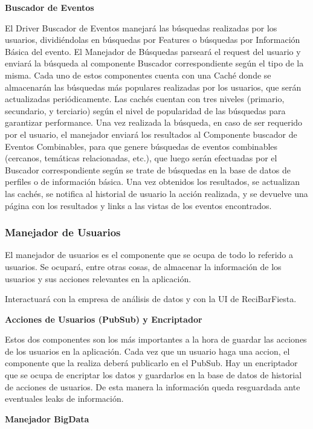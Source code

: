 \textbf{Buscador de Eventos}

El Driver Buscador de Eventos manejará las búsquedas realizadas por los usuarios, dividiéndolas en búsquedas por Features o búsquedas por Información Básica del evento. El Manejador de Búsquedas parseará el request del usuario y enviará la búsqueda al componente Buscador correspondiente según el tipo de la misma. Cada uno de estos componentes cuenta con una Caché donde se almacenarán las búsquedas más populares realizadas por los usuarios, que serán actualizadas periódicamente. Las cachés cuentan con tres niveles (primario, secundario, y terciario) según el nivel de popularidad de las búsquedas para garantizar performance. Una vez realizada la búsqueda, en caso de ser requerido por el usuario, el manejador enviará los resultados al Componente buscador de Eventos Combinables, para que genere búsquedas de eventos combinables (cercanos, temáticas relacionadas, etc.), que luego serán efectuadas por el Buscador correspondiente según se trate de búsquedas en la base de datos de perfiles o de información básica. Una vez obtenidos los resultados, se actualizan las cachés, se notifica al historial de usuario la acción realizada, y se devuelve una página con los resultados y links a las vistas de los eventos encontrados.



\subsubsection{Manejador de Usuarios}

El manejador de usuarios es el componente que se ocupa de todo lo referido a usuarios. Se ocupará, entre otras cosas, de almacenar la información de los usuarios y sus acciones relevantes en la aplicación. 

Interactuará con la empresa de análisis de datos y con la UI de ReciBarFiesta.

\textbf{Acciones de Usuarios (PubSub) y Encriptador}

Estos dos componentes son los más importantes a la hora de guardar las acciones de los usuarios en la aplicación. Cada vez que un usuario haga una accion, el componente que la realiza deberá publicarlo en el PubSub. Hay un encriptador que se ocupa de encriptar los datos y guardarlos en la base de datos de historial de acciones de usuarios. De esta manera la información queda resguardada ante eventuales leaks de información.

\textbf{Manejador BigData}

